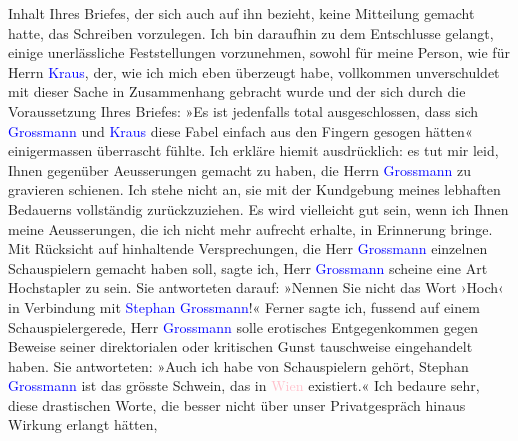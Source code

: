                     Inhalt Ihres Briefes, der sich auch auf ihn bezieht, keine Mitteilung gemacht
                    hatte, das Schreiben vorzulegen. Ich bin daraufhin zu dem Entschlusse gelangt,
                    einige unerlässliche Feststellungen vorzunehmen, sowohl für meine Person, wie
                    für Herrn \textcolor{blue}{Kraus}{}\ledrightnote{\textcolor{blue}{Karl Kraus}}, der, wie ich mich eben
                    überzeugt habe, vollkommen unverschuldet mit dieser Sache in Zusammenhang
                    gebracht wurde und der sich durch die Voraussetzung Ihres Briefes: »Es ist
                    jedenfalls total ausgeschlossen, dass sich \textcolor{blue}{Grossmann}{}\ledrightnote{\textcolor{blue}{Stefan Großmann}} und \textcolor{blue}{Kraus}{}\ledrightnote{\textcolor{blue}{Karl Kraus}} diese Fabel
                    einfach aus den Fingern gesogen hätten« einigermassen überrascht fühlte.\pend
           \pstart
           Ich erkläre hiemit ausdrücklich: es tut mir leid, Ihnen gegenüber Aeusserungen
                    gemacht zu haben, die Herrn \textcolor{blue}{Grossmann}{}\ledrightnote{\textcolor{blue}{Stefan Großmann}} zu
                    gravieren schienen. Ich stehe nicht an, sie mit der Kundgebung meines lebhaften
                    Bedauerns vollständig zurückzuziehen. Es wird vielleicht gut sein, wenn ich
                    Ihnen meine Aeusserungen, die ich nicht mehr aufrecht erhalte, in Erinnerung
                    bringe. Mit Rücksicht auf hinhaltende Versprechungen, die Herr \textcolor{blue}{Grossmann}{}\ledrightnote{\textcolor{blue}{Stefan Großmann}} einzelnen {\pb}Schauspielern gemacht haben soll, sagte ich, Herr \textcolor{blue}{Grossmann}{}\ledrightnote{\textcolor{blue}{Stefan Großmann}} scheine eine Art Hochstapler zu sein. Sie
                    antworteten darauf: »Nennen Sie nicht das Wort ›Hoch‹ in Verbindung mit \textcolor{blue}{Stephan Grossmann}{}\ledrightnote{\textcolor{blue}{Stefan Großmann}}!« Ferner sagte ich,
                    fussend auf einem Schauspielergerede, Herr \textcolor{blue}{Grossmann}{}\ledrightnote{\textcolor{blue}{Stefan Großmann}} solle erotisches Entgegenkommen gegen Beweise seiner
                    direktorialen oder kritischen Gunst tauschweise eingehandelt haben. Sie
                    antworteten: »Auch ich habe von Schauspielern gehört, Stephan \textcolor{blue}{Grossmann}{}\ledrightnote{\textcolor{blue}{Stefan Großmann}} ist das grösste Schwein, das in \textcolor{pink}{Wien}{}\ledrightnote{\textcolor{pink}{Wien}} existiert.« Ich bedaure sehr, diese drastischen
                    Worte, die besser nicht über unser Privatgespräch hinaus Wirkung erlangt hätten,
